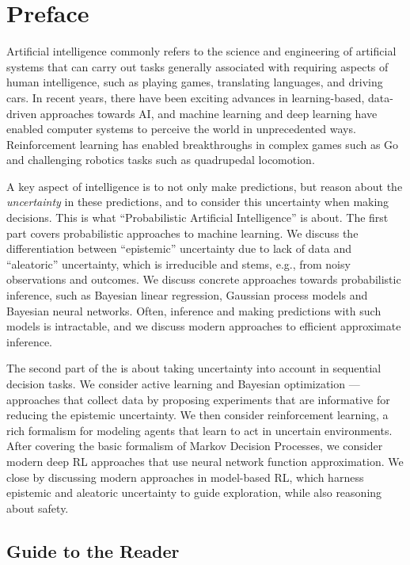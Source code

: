 \chapter*{Preface}

Artificial intelligence commonly refers to the science and engineering of artificial systems that can carry out tasks generally associated with requiring aspects of human intelligence, such as playing games, translating languages, and driving cars.
In recent years, there have been exciting advances in learning-based, data-driven approaches towards AI, and machine learning and deep learning have enabled computer systems to perceive the world in unprecedented ways.
Reinforcement learning has enabled breakthroughs in complex games such as Go and challenging robotics tasks such as quadrupedal locomotion.

A key aspect of intelligence is to not only make predictions, but reason about the {\em uncertainty} in these predictions, and to consider this uncertainty when making decisions.
This is what ``Probabilistic Artificial Intelligence'' is about.
The first part covers probabilistic approaches to machine learning.
We discuss the differentiation between ``epistemic'' uncertainty due to lack of data and ``aleatoric'' uncertainty, which is irreducible and stems, e.g., from noisy observations and outcomes.
We discuss concrete approaches towards probabilistic inference, such as Bayesian linear regression, Gaussian process models and Bayesian neural networks.
Often, inference and making predictions with such models is intractable, and we discuss modern approaches to efficient approximate inference.

The second part of the \course is about taking uncertainty into account in sequential decision tasks.
We consider active learning and Bayesian optimization --- approaches that collect data by proposing experiments that are informative for reducing the epistemic uncertainty.
We then consider reinforcement learning, a rich formalism for modeling agents that learn to act in uncertain environments.
After covering the basic formalism of Markov Decision Processes, we consider modern deep RL approaches that use neural network function approximation.
We close by discussing modern approaches in model-based RL, which harness epistemic and aleatoric uncertainty to guide exploration, while also reasoning about safety.

\section*{Guide to the Reader}

